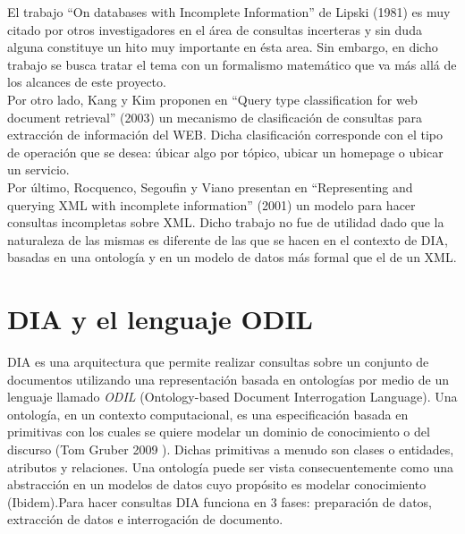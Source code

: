 El trabajo “On databases with Incomplete Information” de Lipski (1981)\cite{onDatabasesWithIncompleteInformation} es muy citado por otros investigadores en el área de consultas incerteras y sin duda alguna constituye un hito muy importante en ésta area. Sin embargo, en dicho trabajo se busca tratar el tema con un formalismo matemático que va más allá de los alcances de este proyecto. \\

Por otro lado, Kang y Kim proponen en  “Query type classification for web document retrieval” (2003)\cite{queryTypeClasWebDocumentRetrieval} un mecanismo de clasificación de consultas para extracción de información del WEB. Dicha clasificación corresponde con el tipo de operación que se desea: úbicar algo por tópico, ubicar un homepage o ubicar un servicio. \\

Por último, Rocquenco, Segoufin y Viano presentan en “Representing and querying XML with incomplete information” (2001)\cite{repAndQueryXMLIncompInfo} un modelo para hacer consultas incompletas sobre XML.  Dicho trabajo no fue de utilidad dado que la naturaleza de las mismas es diferente de las que se hacen en el contexto de DIA, basadas en una ontología y en un modelo de datos más formal que el de un XML. \\


\section{DIA y el lenguaje ODIL}

 DIA es una arquitectura que permite realizar consultas sobre un conjunto de documentos  utilizando una representación basada en ontologías por medio de un lenguaje llamado \emph{ODIL} (Ontology-based Document Interrogation Language). Una ontología, en un contexto computacional, es una especificación basada en primitivas con los cuales se quiere modelar un dominio de conocimiento o del discurso (Tom Gruber 2009 \cite{defOntology}). Dichas primitivas a menudo son clases o entidades, atributos y relaciones. Una ontología puede ser vista consecuentemente como una abstracción en un modelos de datos cuyo propósito es modelar conocimiento (Ibidem).Para hacer consultas DIA funciona en 3 fases: preparación de datos, extracción de datos e interrogación de documento. \\

